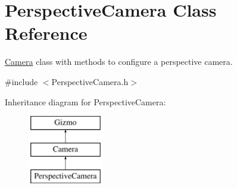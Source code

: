 \hypertarget{class_perspective_camera}{\section{Perspective\+Camera Class Reference}
\label{class_perspective_camera}
}


\hyperlink{class_camera}{Camera} class with methods to configure a perspective camera.  




{\ttfamily \#include $<$Perspective\+Camera.\+h$>$}

Inheritance diagram for Perspective\+Camera\+:\begin{figure}[H]
\begin{center}
\leavevmode
\includegraphics[height=3.000000cm]{class_perspective_camera}
\end{center}
\end{figure}
